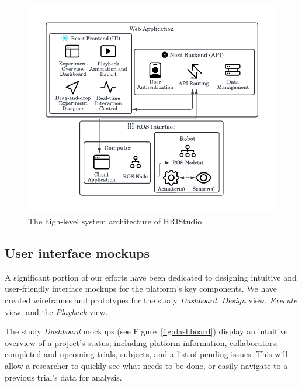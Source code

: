 \documentclass[letterpaper, 10 pt, conference]{ieeeconf}
\begin{document}
\begin{figure}[ht]
   \vskip -0.3cm
    \begin{center}
        \includegraphics[width=0.4\paperwidth]{assets/diagrams/systemarch}
        \vskip -0.3cm
        \caption{The high-level system architecture of HRIStudio}
        \label{fig:systemarch}
    \end{center}
     \vskip -0.7cm
\end{figure}

\subsection{User interface mockups}

A significant portion of our efforts have been dedicated to designing intuitive and user-friendly interface mockups for the platform's key components. We have created wireframes and prototypes for the study \emph{Dashboard}, \emph{Design} view, \emph{Execute} view, and the \emph{Playback} view.

The study \emph{Dashboard} mockups (see Figure~\ref{fig:dashboard}) display an intuitive overview of a project's status, including platform information, collaborators, completed and upcoming trials, subjects, and a list of pending issues. This will allow a researcher to quickly see what needs to be done, or easily navigate to a previous trial's data for analysis.
\end{document}
